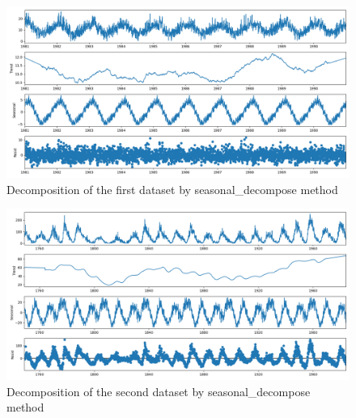 \documentclass[12pt]{article}
\begin{document}
\begin{enumerate}
\begin{figure}[H]
    \centering
    \begin{minipage}[b]{1\textwidth}
        \includegraphics[width=\textwidth]{figures/Ass1/Ass1_D1_seasonal_decompose.png}
    \end{minipage}
    \caption{Decomposition of the first dataset by seasonal\_decompose method}
    \label{fig:Ass1_D1_seasonal_decompose}
\end{figure}

\begin{figure}[H]
    \centering
    \begin{minipage}[b]{1\textwidth}
        \includegraphics[width=\textwidth]{figures/Ass1/Ass1_D2_seasonal_decompose.png}
    \end{minipage}
    \caption{Decomposition of the second dataset by seasonal\_decompose method}
    \label{fig:Ass1_D2_seasonal_decompose}
\end{figure}


\end{enumerate}
\end{document}
